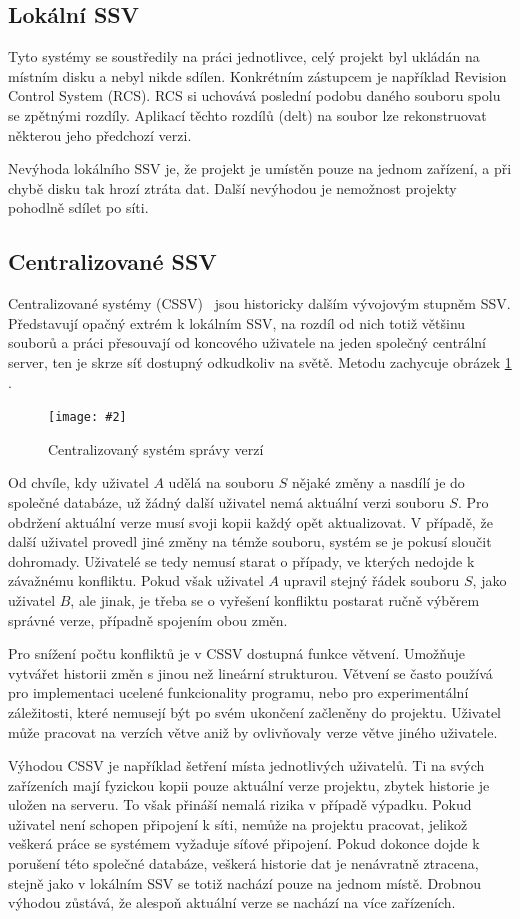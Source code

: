 \documentclass[
  biblatex,
  glossaries,
  index
]{kidiplom}
\newcommand{\pic}[4]{
\begin{figure}[h]
\centering
\texttt{[image: \#2]}
\caption{#3}
\label{fig:#4}
\end{figure}}
\begin{document}
\subsection{Lokální SSV}
Tyto systémy se soustředily na práci jednotlivce, celý projekt byl 
ukládán na místním disku a nebyl nikde sdílen. Konkrétním zástupcem je 
například Revision Control System (RCS). RCS si uchovává poslední podobu  
daného souboru spolu se zpětnými rozdíly. Aplikací těchto rozdílů (delt) 
na soubor lze rekonstruovat některou jeho předchozí verzi.

Nevýhoda lokálního SSV je, že projekt je umístěn pouze na jednom 
zařízení, a při chybě disku tak hrozí ztráta dat. Další nevýhodou je 
nemožnost projekty pohodlně sdílet po síti.

\subsection{Centralizované SSV}
Centralizované systémy (CSSV)~\cite{otte} jsou historicky dalším vývojovým stupněm SSV. 
Představují opačný extrém k lokálním SSV, na rozdíl od nich totiž 
většinu souborů a práci přesouvají od koncového uživatele na jeden 
společný centrální server, ten je skrze síť dostupný odkudkoliv na světě. Metodu zachycuje obrázek \ref{fig:centralized} \cite{gitreference}.

\pic{10cm}{centralized.png}{Centralizovaný systém správy verzí}{centralized}

Od chvíle, kdy uživatel $A$ udělá na souboru $S$ nějaké změny a nasdílí
je do společné databáze, už žádný další uživatel nemá aktuální
verzi souboru $S$.
Pro obdržení aktuální verze musí svoji kopii každý opět aktualizovat.
V případě, že další uživatel provedl jiné změny na témže souboru,
systém se je pokusí sloučit dohromady. Uživatelé se tedy nemusí starat o 
případy, ve kterých nedojde k závažnému konfliktu. Pokud však uživatel $A$ 
upravil stejný řádek souboru $S$, jako uživatel $B$, ale jinak, je třeba se 
o vyřešení konfliktu postarat ručně výběrem správné verze, případně
spojením obou změn.

Pro snížení počtu konfliktů je v CSSV dostupná funkce větvení. Umožňuje 
vytvářet historii změn s jinou než lineární strukturou. Větvení se často
používá pro implementaci ucelené funkcionality programu, nebo pro 
experimentální záležitosti, které nemusejí být po svém ukončení začleněny 
do projektu. Uživatel může pracovat na verzích větve aniž by ovlivňovaly
verze větve jiného uživatele.

Výhodou CSSV je například
šetření místa jednotlivých uživatelů. Ti na svých zařízeních mají fyzickou 
kopii pouze aktuální verze projektu, zbytek historie je uložen na serveru.
To však přináší nemalá rizika v případě výpadku. Pokud uživatel není
schopen připojení k síti, nemůže na projektu pracovat, jelikož veškerá
práce se systémem vyžaduje síťové připojení. Pokud dokonce dojde k
porušení této společné databáze, veškerá historie dat je nenávratně
ztracena, stejně jako v lokálním SSV se totiž nachází pouze na jednom místě. Drobnou výhodou 
zůstává, že alespoň aktuální verze se nachází na více zařízeních.
\end{document}
